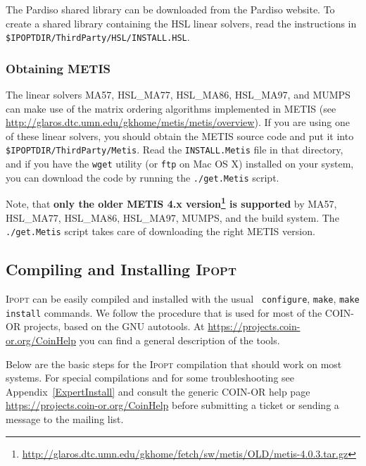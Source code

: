 \documentclass[10pt]{article}
\newcommand{\Ipopt}{\textsc{Ipopt}\xspace}
\begin{document}
The Pardiso shared library can be downloaded from the Pardiso website.
To create a shared library containing the HSL linear solvers, read the
instructions in \texttt{\$IPOPTDIR/ThirdParty/HSL/INSTALL.HSL}.

\subsubsection{Obtaining METIS}\label{sec:METIS}

The linear solvers MA57, HSL\_MA77, HSL\_MA86, HSL\_MA97, and MUMPS can make 
use of the matrix ordering algorithms implemented in METIS (see
\url{http://glaros.dtc.umn.edu/gkhome/metis/metis/overview}).  If
you are using one of these linear solvers, you should obtain the METIS
source code and put it into \texttt{\$IPOPTDIR/ThirdParty/Metis}.
Read the \texttt{INSTALL.Metis} file in that directory, and if you
have the \texttt{wget} utility (or \texttt{ftp} on Mac OS X) installed on your 
system, you can download the code by running the \texttt{./get.Metis} script.

Note, that {\bf only the older METIS 4.x version\footnote{\url{http://glaros.dtc.umn.edu/gkhome/fetch/sw/metis/OLD/metis-4.0.3.tar.gz}} is supported} by
MA57, HSL\_MA77, HSL\_MA86, HSL\_MA97, MUMPS, and the build system.
The \texttt{./get.Metis} script takes care of downloading the right METIS version.

\subsection{Compiling and Installing \Ipopt} \label{sec.comp_and_inst}

\Ipopt can be easily compiled and installed with the usual {\tt
  configure}, {\tt make}, {\tt make install} commands.  We follow the
procedure that is used for most of the COIN-OR projects, based on the
GNU autotools.  At \url{https://projects.coin-or.org/CoinHelp}
you can find a general description of the tools.

Below are the basic steps for the \Ipopt compilation that should work
on most systems.  For special compilations and for some
troubleshooting see Appendix~\ref{ExpertInstall} and consult the
generic COIN-OR help page
\url{https://projects.coin-or.org/CoinHelp} before submitting a
ticket or sending a message to the mailing list.
\end{document}
